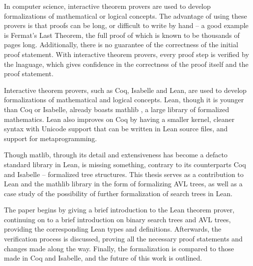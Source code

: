 In computer science, interactive theorem provers are used to develop formalizations of mathematical or logical concepts. The advantage of using these provers is that proofs can be long, or difficult to write by hand -- a good example is Fermat's Last Theorem, the full proof of which is known to be thousands of pages long. Additionally, there is no guarantee of the correctness of the initial proof statement. With interactive theorem provers, every proof step is verified by the lnaguage, which gives confidence in the correctness of the proof itself and the proof statement.

Interactive theorem provers, such as Coq, Isabelle and Lean, are used to develop formalizations of mathematical and logical concepts. Lean, though it is younger than Coq or Isabelle, already boasts mathlib \cite{The_mathlib_Community_2020}, a large library of formalized mathematics. Lean also improves on Coq by having a smaller kernel, cleaner syntax with Unicode support that can be written in Lean source files, and support for metaprogramming. 

Though matlib, through its detail and extensiveness has become a defacto standard library in Lean, is missing something, contrary to its counterparts Coq and Isabelle -- formalized tree structures. This thesis serves as a contribution to Lean and the mathlib library in the form of formalizing AVL trees, as well as a case study of the possibility of further formalization of search trees in Lean. 

The paper begins by giving a brief introduction to the Lean theorem prover, continuing on to a brief introduction on binary search trees and AVL trees, providing the corresponding Lean types and definitions. Afterwards, the verification process is discussed, proving all the necessary proof statements and changes made along the way. Finally, the formalization is compared to those made in Coq and Isabelle, and the future of this work is outlined.